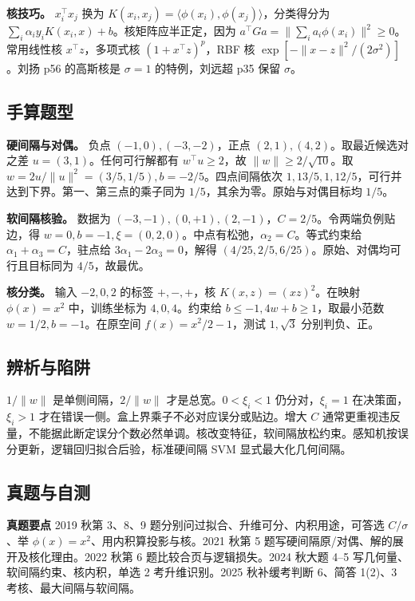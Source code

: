 \documentclass[UTF8,a4paper,zihao=-4,fontset=fandol]{ctexart}
\begin{document}
\textbf{核技巧。} \(x_i^\top x_j\) 换为 \(K(x_i,x_j)=\langle\phi(x_i),\phi(x_j)\rangle\)，分类得分为 \(\sum_i\alpha_i y_iK(x_i,x)+b\)。核矩阵应半正定，因为 \(a^\top G a=\|\sum_i a_i\phi(x_i)\|^2\ge0\)。常用线性核 \(x^\top z\)，多项式核 \((1+x^\top z)^p\)，RBF 核 \(\exp[-\|x-z\|^2/(2\sigma^2)]\)。刘扬 p56 的高斯核是 \(\sigma=1\) 的特例，刘远超 p35 保留 \(\sigma\)。

\subsection{手算题型}
\textbf{硬间隔与对偶。} 负点 \((-1,0),(-3,-2)\)，正点 \((2,1),(4,2)\)。取最近候选对之差 \(u=(3,1)\)。任何可行解都有 \(w^\top u\ge2\)，故 \(\|w\|\ge2/\sqrt{10}\)。取 \(w=2u/\|u\|^2=(3/5,1/5),b=-2/5\)。四点间隔依次 \(1,13/5,1,12/5\)，可行并达到下界。第一、第三点的乘子同为 \(1/5\)，其余为零。原始与对偶目标均 \(1/5\)。

\textbf{软间隔核验。} 数据为 \((-3,-1),(0,+1),(2,-1)\)，\(C=2/5\)。令两端负例贴边，得 \(w=0,b=-1,\xi=(0,2,0)\)。中点有松弛，\(\alpha_2=C\)。等式约束给 \(\alpha_1+\alpha_3=C\)，驻点给 \(3\alpha_1-2\alpha_3=0\)，解得 \((4/25,2/5,6/25)\)。原始、对偶均可行且目标同为 \(4/5\)，故最优。

\textbf{核分类。} 输入 \(-2,0,2\) 的标签 \(+,-,+\)，核 \(K(x,z)=(xz)^2\)。在映射 \(\phi(x)=x^2\) 中，训练坐标为 \(4,0,4\)。约束给 \(b\le-1,4w+b\ge1\)，取最小范数 \(w=1/2,b=-1\)。在原空间 \(f(x)=x^2/2-1\)，测试 \(1,\sqrt3\) 分别判负、正。

\subsection{辨析与陷阱}
\(1/\|w\|\) 是单侧间隔，\(2/\|w\|\) 才是总宽。\(0<\xi_i<1\) 仍分对，\(\xi_i=1\) 在决策面，\(\xi_i>1\) 才在错误一侧。盒上界乘子不必对应误分或贴边。增大 \(C\) 通常更重视违反量，不能据此断定误分个数必然单调。核改变特征，软间隔放松约束。感知机按误分更新，逻辑回归拟合后验，标准硬间隔 SVM 显式最大化几何间隔。

\subsection{真题与自测}
\textbf{真题要点} 2019 秋第 3、8、9 题分别问过拟合、升维可分、内积用途，可答选 \(C/\sigma\)、举 \(\phi(x)=x^2\)、用内积算投影与核。2021 秋第 5 题写硬间隔原/对偶、解的展开及核化理由。2022 秋第 6 题比较合页与逻辑损失。2024 秋大题 4–5 写几何量、软间隔约束、核内积，单选 2 考升维识别。2025 秋补缓考判断 6、简答 1(2)、3 考核、最大间隔与软间隔。
\end{document}
